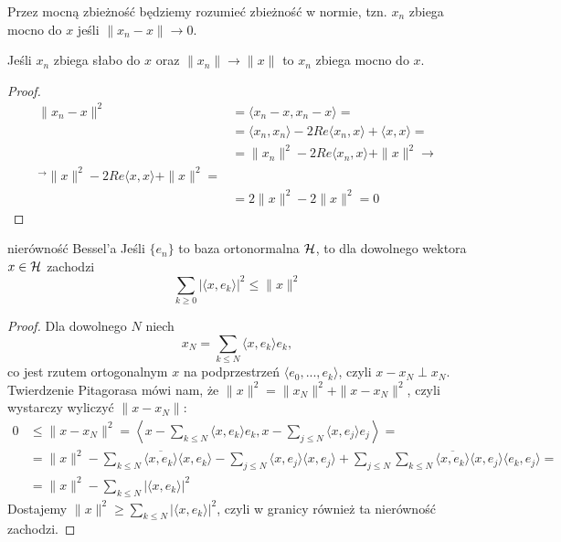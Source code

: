 Przez mocną zbieżność będziemy rozumieć zbieżność w normie, tzn. $x_n$ zbiega mocno do $x$ jeśli $\|x_n-x\|\to 0$.

\begin{remark}{}{}
  Jeśli $x_n$ zbiega słabo do $x$ oraz $\|x_n\|\to \|x\|$ to $x_n$ zbiega mocno do $x$.
\end{remark}

\begin{proof}
  \begin{align*}
    \|x_n-x\|^2&=\langle x_n-x, x_n-x\rangle=\\ 
               &=\langle x_n, x_n\rangle -2Re\langle x_n, x\rangle + \langle x, x\rangle=\\ 
               &=\|x_n\|^2-2Re\langle x_n, x\rangle +\|x\|^2\to\\ 
               ^\to \|x\|^2-2Re\langle x, x\rangle + \|x\|^2=\\ 
               &=2\|x\|^2-2\|x\|^2=0
  \end{align*}
\end{proof}

\begin{theorem}{nierówność Bessel'a}{}
  Jeśli $\{e_n\}$ to baza ortonormalna $\operatorname{\mathcal{H}}$, to dla dowolnego wektora $x\in\operatorname{\mathcal{H}}$ zachodzi
  $$\sum_{k\geq 0}|\langle x, e_k\rangle|^2\leq \|x\|^2$$
\end{theorem}

\begin{proof}
  Dla dowolnego $N$ niech 
  $$x_N=\sum_{k\leq N}\langle x, e_k\rangle e_k,$$
  co jest rzutem ortogonalnym $x$ na podprzestrzeń $\langle e_0,...,e_k\rangle$, czyli $x-x_N\perp x_N$. Twierdzenie Pitagorasa mówi nam, że $\|x\|^2=\|x_N\|^2+\|x-x_N\|^2$, czyli wystarczy wyliczyć $\|x-x_N\|$:
  \begin{align*}
    0&\leq \|x-x_N\|^2=\left\langle x-\sum_{k\leq N}\langle x, e_k\rangle e_k, x-\sum_{j\leq N}\langle x, e_j\rangle e_j\right\rangle=\\ 
                     &=\|x\|^2-\sum_{k\leq N}\overline{\langle x, e_k\rangle}\langle x, e_k\rangle-\sum_{j\leq N}\langle x, e_j\rangle \langle x, e_j\rangle+\sum_{j\leq N}\sum_{k\leq N}\overline{\langle x, e_k\rangle}\langle x, e_j\rangle\langle e_k, e_j\rangle=\\ 
                     &=\|x\|^2-\sum_{k\leq N}|\langle x, e_k\rangle|^2
  \end{align*}
  Dostajemy $\|x\|^2\geq \sum_{k\leq N}|\langle x, e_k\rangle|^2$, czyli w granicy również ta nierówność zachodzi.
\end{proof}


